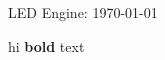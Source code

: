 \documentclass{led_doc}
\begin{document}
LED Engine: \today \hrulefill

\begin{ledCmnt}
hi \textbf{bold} text
\end{ledCmnt}

\begin{ledDef}
\end{ledDef}
\end{document}
